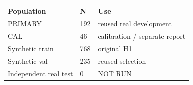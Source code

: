 \begin{tabular}{lll}
\hline
Population & N & Use \\
\hline
PRIMARY & 192 & reused real development \\
CAL & 46 & calibration / separate report \\
Synthetic train & 768 & original H1 \\
Synthetic val & 235 & reused selection \\
Independent real test & 0 & NOT RUN \\
\hline
\end{tabular}
